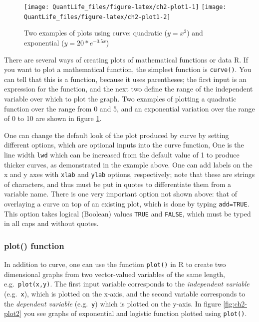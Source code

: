 \documentclass[
]{book}
\theoremstyle{definition}
\theoremstyle{definition}
\theoremstyle{definition}
\theoremstyle{remark}
\begin{document}
\begin{figure}

{\centering \texttt{[image: QuantLife\_files/figure-latex/ch2-plot1-1]} \texttt{[image: QuantLife\_files/figure-latex/ch2-plot1-2]} 

}

\caption{Two examples of plots using curve: quadratic ($y=x^2$) and exponential ($y=20*e^{-0.5x}$)}\label{fig:ch2-plot1}
\end{figure}

There are several ways of   creating plots of mathematical functions or data R. If you want to plot a mathematical function, the simplest function is \texttt{curve()}. You can tell that this is a function, because it uses parentheses; the first input is an expression for the function, and the next two define the range of the independent variable over which to plot the graph. Two examples of plotting a quadratic function over the range from 0 and 5, and an exponential variation over the range of 0 to 10 are shown in figure \ref{fig:ch2-plot1}.

One can change the default look of the plot produced by curve by setting different options, which are optional inputs into the curve function, One is the line width \texttt{lwd} which can be increased from the default value of 1 to produce thicker curves, as demonstrated in the example above. One can add labels on the x and y axes with \texttt{xlab} and \texttt{ylab} options, respectively; note that these are strings of characters, and thus must be put in quotes to differentiate them from a variable name. There is one very important option not shown above: that of overlaying a curve on top of an existing plot, which is done by typing \texttt{add=TRUE}. This option takes logical (Boolean) values \texttt{TRUE} and \texttt{FALSE}, which must be typed in all caps and without quotes.

\hypertarget{plot-function}{%
\subsubsection{plot() function}\label{plot-function}}

In addition to curve, one can use the function \texttt{plot()} in R to create two dimensional graphs from two vector-valued variables of the same length, e.g.~\texttt{plot(x,y)}. The first input variable corresponds to the  \emph{independent variable} (e.g.~\texttt{x}), which is plotted on the x-axis, and the second variable corresponds to the  \emph{dependent variable} (e.g.~\texttt{y}) which is plotted on the y-axis. In figure \ref{fig:ch2-plot2} you see graphs of exponential and logistic function plotted using \texttt{plot()}.
\end{document}
